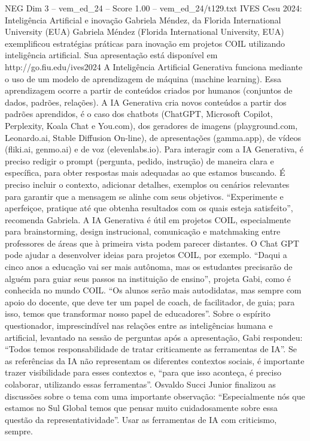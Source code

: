 \begin{textsample}{NEG Dim 3 – vem\_ed\_24 – Score 1.00 – vem\_ed\_24/t129.txt}  \label{ex:f3_neg_021}
IVES Cesu 2024: Inteligência Artificial e inovação Gabriela Méndez, da Florida International University (EUA) Gabriela Méndez (Florida International University, EUA) exemplificou estratégias práticas para inovação em projetos COIL utilizando inteligência artificial.
Sua apresentação está disponível em http://go.fiu.edu/ives2024 A Inteligência Artificial Generativa funciona mediante o uso de um modelo de aprendizagem de máquina (machine learning).
Essa aprendizagem ocorre a partir de conteúdos criados por humanos (conjuntos de dados, padrões, relações).
A IA Generativa cria novos conteúdos a partir dos padrões aprendidos, é o caso dos chatbots (ChatGPT, Microsoft Copilot, Perplexity, Koala Chat e You.com), dos geradores de imagens (playground.com, Leonardo.ai, Stable Diffusion On-line), de apresentações (gamma.app), de vídeos (fliki.ai, genmo.ai) e de voz (elevenlabs.io).
Para interagir com a IA Generativa, é preciso redigir o prompt (pergunta, pedido, instrução) de maneira clara e específica, para obter respostas mais adequadas ao que estamos buscando.
É preciso incluir o contexto, adicionar detalhes, exemplos ou cenários relevantes para garantir que a mensagem se alinhe com seus objetivos. “Experimente e aperfeiçoe, pratique até que obtenha resultados com os quais esteja satisfeito”, recomenda Gabriela.
A IA Generativa é útil em projetos COIL, especialmente para brainstorming, design instrucional, comunicação e matchmaking entre professores de áreas que à primeira vista podem parecer distantes.
O Chat GPT pode ajudar a desenvolver ideias para projetos COIL, por exemplo. “Daqui a cinco anos a educação vai ser mais autônoma, mas os estudantes precisarão de alguém para guiar seus passos na instituição de ensino”, projeta Gabi, como é conhecida no mundo COIL. “Os alunos serão mais autodidatas, mas sempre com apoio do docente, que deve ter um papel de coach, de facilitador, de guia; para isso, temos que transformar nosso papel de educadores”.
Sobre o espírito questionador, imprescindível nas relações entre as inteligências humana e artificial, levantado na sessão de perguntas após a apresentação, Gabi respondeu: “Todos temos responsabilidade de tratar criticamente as ferramentas de IA”.
Se as referências da IA não representam os diferentes contextos sociais, é importante trazer visibilidade para esses contextos e, “para que isso aconteça, é preciso colaborar, utilizando essas ferramentas”.
Osvaldo Succi Junior finalizou as discussões sobre o tema com uma importante observação: “Especialmente nós que estamos no Sul Global temos que pensar muito cuidadosamente sobre essa questão da representatividade”.
Usar as ferramentas de IA com criticismo, sempre.

\end{textsample}

